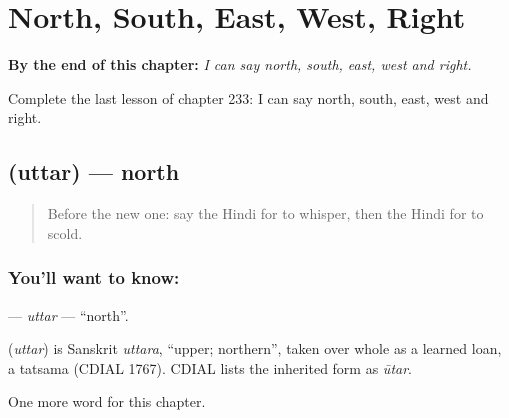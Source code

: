 
\chapter{North, South, East, West, Right}
\label{ch:hi-north-south-east-west-right}

\begin{chapteropening}
\textbf{By the end of this chapter:} \emph{I can say north, south, east, west and right.}

Complete the last lesson of chapter 233: I can say north, south, east, west and right.
\end{chapteropening}

\section[\texorpdfstring{\hi{उत्तर} (uttar)}{उत्तर (uttar)}]{ (uttar) — north}

\label{lesson:HI-C233-uttar}



\begin{quote}
Before the new one: say the Hindi for to whisper, then the Hindi for to scold.
\end{quote}

\subsection*{You'll want to know: }
\textbf{} — \emph{uttar} — \textquotedblleft{}north\textquotedblright{}.

\begin{cousinweb}
\textbf{} (\emph{uttar}) is Sanskrit \emph{uttara}, \textquotedblleft{}upper; northern\textquotedblright{}, taken over whole as a learned loan, a tatsama (CDIAL 1767). CDIAL lists the inherited form as \emph{ūtar}.
\end{cousinweb}

\begin{grammarlens}[title={What you've built}]
One more word for this chapter.
\end{grammarlens}

